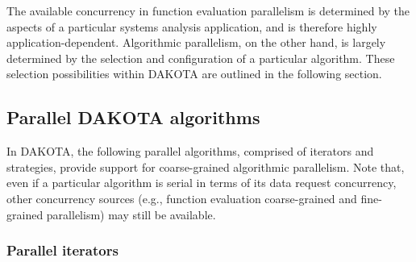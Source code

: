 The available concurrency in function evaluation parallelism is
determined by the aspects of a particular systems analysis
application, and is therefore highly application-dependent.
Algorithmic parallelism, on the other hand, is largely determined by
the selection and configuration of a particular algorithm.  These
selection possibilities within DAKOTA are outlined in the following
section.


\subsection{Parallel DAKOTA algorithms} \label{parallel:algorithms}

In DAKOTA, the following parallel algorithms, comprised of iterators
and strategies, provide support for coarse-grained algorithmic
parallelism.  Note that, even if a particular algorithm is serial in
terms of its data request concurrency, other concurrency sources
(e.g., function evaluation coarse-grained and fine-grained
parallelism) may still be available.

\subsubsection{Parallel iterators}\label{parallel:algorithms:iterators}

